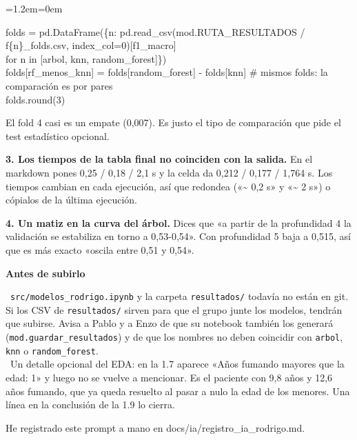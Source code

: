 \documentclass[11pt,a4paper]{article}
\newenvironment{codigo}
  {\par\smallskip\begin{list}{}{\leftmargin=1.2em\rightmargin=0em}\item\relax\ttfamily\scriptsize\raggedright}
  {\end{list}\smallskip}
\begin{document}
{\begin{codigo}
folds = pd.DataFrame(\{n: pd.read\_\allowbreak{}csv(mod.RUTA\_\allowbreak{}RESULTADOS /\allowbreak{} f\textquotedbl{}\{n\}\_\allowbreak{}folds.csv\textquotedbl{}, index\_\allowbreak{}col=0)[\textquotedbl{}f1\_\allowbreak{}macro\textquotedbl{}] \\{}
\hspace*{11.44em}for n in [\textquotedbl{}arbol\textquotedbl{}, \textquotedbl{}knn\textquotedbl{}, \textquotedbl{}random\_\allowbreak{}forest\textquotedbl{}]\}) \\{}
folds[\textquotedbl{}rf\_\allowbreak{}menos\_\allowbreak{}knn\textquotedbl{}] = folds[\textquotedbl{}random\_\allowbreak{}forest\textquotedbl{}] - folds[\textquotedbl{}knn\textquotedbl{}]   \# mismos folds: la comparación es por pares \\{}
folds.round(3)
\end{codigo}
El fold 4 casi es un empate (0,007). Es justo el tipo de comparación que pide el test estadístico opcional.

\textbf{3. Los tiempos de la tabla final no coinciden con la salida.} En el markdown pones 0,25 /\allowbreak{} 0,18 /\allowbreak{} 2,1 s y la celda da 0,212 /\allowbreak{} 0,177 /\allowbreak{} 1,764 s. Los tiempos cambian en cada ejecución, así que redondea («\textasciitilde{} 0,2 s» y «\textasciitilde{} 2 s») o cópialos de la última ejecución.

\textbf{4. Un matiz en la curva del árbol.} Dices que «a partir de la profundidad 4 la validación se estabiliza en torno a 0,53-0,54». Con profundidad 5 baja a 0,515, así que es más exacto «oscila entre 0,51 y 0,54».

\smallskip\noindent\textbf{Antes de subirlo}\par
\hspace*{1.0em}\textbullet~\texttt{src/\allowbreak{}modelos\_\allowbreak{}rodrigo.ipynb} y la carpeta \texttt{resultados/\allowbreak{}} todavía no están en git. Si los CSV de \texttt{resultados/\allowbreak{}} sirven para que el grupo junte los modelos, tendrán que subirse. Avisa a Pablo y a Enzo de que su notebook también los generará (\texttt{mod.guardar\_\allowbreak{}resultados}) y de que los nombres no deben coincidir con \texttt{arbol}, \texttt{knn} o \texttt{random\_\allowbreak{}forest}. \\{}
\hspace*{1.0em}\textbullet~Un detalle opcional del EDA: en la 1.7 aparece «Años fumando mayores que la edad: 1» y luego no se vuelve a mencionar. Es el paciente con 9,8 años y 12,6 años fumando, que ya queda resuelto al pasar a nulo la edad de los menores. Una línea en la conclusión de la 1.9 lo cierra.

He registrado este prompt a mano en docs/\allowbreak{}ia/\allowbreak{}registro\_\allowbreak{}ia\_\allowbreak{}rodrigo.md.

}
\end{document}
